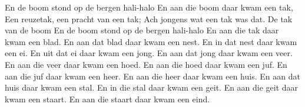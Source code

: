 \beginchorus
En de boom stond op de bergen hali-halo 
En aan die boom daar kwam een tak,
Een reuzetak, een pracht van een tak;
Ach jongens wat een tak was dat.
De tak van de boom
En de boom stond op de bergen hali-halo 
\endchorus
\beginverse
En aan die tak daar kwam een blad.
\endverse
\beginverse
En aan dat blad daar kwam een nest. 
\endverse
\beginverse
En in dat nest daar kwam een ei.
\endverse
\beginverse
En uit dat ei daar kwam een jong. 
\endverse
\beginverse
En aan dat jong daar kwam een veer. 
\endverse
\beginverse
En aan die veer daar kwam een hoed. 
\endverse
\beginverse
En aan die hoed daar kwam een juf. 
\endverse
\beginverse
En aan die juf daar kwam een heer. 
\endverse
\beginverse
En aan die heer daar kwam een huis.
\endverse
\beginverse
En aan dat huis daar kwam een stal.
\endverse
\beginverse
En in die stal daar kwam een geit.
\endverse
\beginverse
En aan die geit daar kwam een staart. 
\endverse
\beginverse
En aan die staart daar kwam een eind. 
\endverse
\endsong